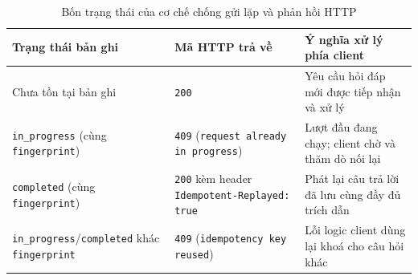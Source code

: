 \begin{table}[htbp]
\centering
\caption{Bốn trạng thái của cơ chế chống gửi lặp và phản hồi HTTP}
\label{tab:trang-thai-idempotency-ch5}
\small
\begin{tabularx}{\textwidth}{
  >{\raggedright\arraybackslash}p{4.3cm}
  >{\raggedright\arraybackslash}p{4.1cm}
  >{\raggedright\arraybackslash}X
}
\toprule
\textbf{Trạng thái bản ghi} & \textbf{Mã HTTP trả về} & \textbf{Ý nghĩa xử lý phía client} \\
\midrule
Chưa tồn tại bản ghi & \texttt{200} & Yêu cầu hỏi đáp mới được tiếp nhận và xử lý \\
\midrule
\texttt{in\_progress} (cùng \texttt{fingerprint}) & \texttt{409} (\texttt{request already in progress}) & Lượt đầu đang chạy; client chờ và thăm dò nối lại \\
\midrule
\texttt{completed} (cùng \texttt{fingerprint}) & \texttt{200} kèm header \texttt{Idempotent-\allowbreak{}Replayed:\allowbreak{} true} & Phát lại câu trả lời đã lưu cùng đầy đủ trích dẫn \\
\midrule
\texttt{in\_progress}/\texttt{completed} khác \texttt{fingerprint} & \texttt{409} (\texttt{idempotency key reused}) & Lỗi logic client dùng lại khoá cho câu hỏi khác \\
\bottomrule
\end{tabularx}
\end{table}


